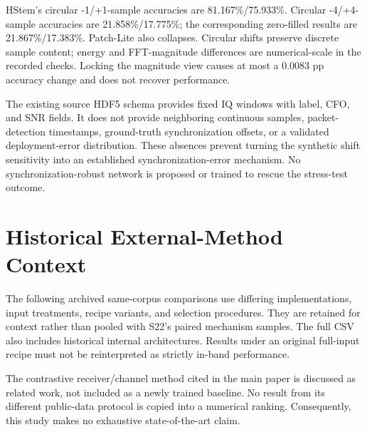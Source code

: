 \documentclass[11pt]{article}
\begin{document}
HStem's circular -1/+1-sample accuracies are 81.167\%/75.933\%. Circular -4/+4-sample accuracies are 21.858\%/17.775\%; the corresponding zero-filled results are 21.867\%/17.383\%. Patch-Lite also collapses. Circular shifts preserve discrete sample content; energy and FFT-magnitude differences are numerical-scale in the recorded checks. Locking the magnitude view causes at most a 0.0083 pp accuracy change and does not recover performance.

The existing source HDF5 schema provides fixed IQ windows with label, CFO, and SNR fields. It does not provide neighboring continuous samples, packet-detection timestamps, ground-truth synchronization offsets, or a validated deployment-error distribution. These absences prevent turning the synthetic shift sensitivity into an established synchronization-error mechanism. No synchronization-robust network is proposed or trained to rescue the stress-test outcome.

\section{Historical External-Method Context}
The following archived same-corpus comparisons use differing implementations, input treatments, recipe variants, and selection procedures. They are retained for context rather than pooled with S22's paired mechanism samples. The full CSV also includes historical internal architectures. Results under an original full-input recipe must not be reinterpreted as strictly in-band performance.



The contrastive receiver/channel method cited in the main paper is discussed as related work, not included as a newly trained baseline. No result from its different public-data protocol is copied into a numerical ranking. Consequently, this study makes no exhaustive state-of-the-art claim.
\end{document}
